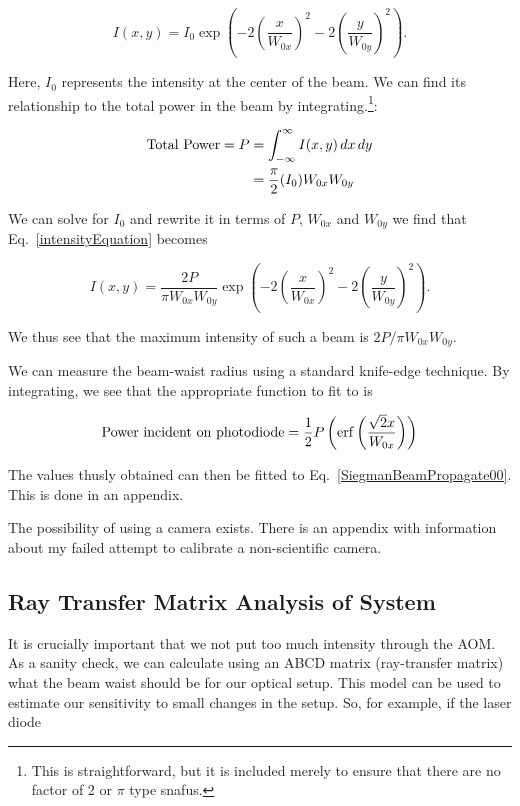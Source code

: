 \begin{equation}
I(x,y)=I_0 \exp \left( -2 \left(\frac{x}{W_{0x}} \right)^2-2 \left( \frac{y}{W_{0y}}\right)^2\right). \label{intensityEquation}
\end{equation}

Here, $I_0$ represents the intensity at the center of the beam. We can find its relationship to the total power in the beam by integrating.\footnote{This is straightforward, but it is included merely to ensure that there are no factor of 2 or $\pi$ type snafus.}: 

\begin{align}
{\rm Total\ Power}=P&=\int_{-\infty}^\infty I(x,y)\, dx\, dy\\
&=\frac{\pi}{2}(I_0) W_{0x} W_{0y}
\end{align}

We can solve for $I_0$ and rewrite it in terms of $P$, $W_{0x}$ and $W_{0y}$ we find that Eq.\ \ref{intensityEquation} becomes 

\begin{equation}
I(x,y)= \frac{2 P}{\pi W_{0x} W_{0y}}\exp \left( -2 \left(\frac{x}{W_{0x}} \right)^2-2 \left( \frac{y}{W_{0y}}\right)^2\right). \label{intensityEquation2}
\end{equation}

We thus see that the maximum intensity of such a beam is $2P/\pi W_{0x}W_{0y}$.

We can measure the beam-waist radius using a standard knife-edge technique. By integrating, we see that the appropriate function to fit to is 

\begin{equation}
{\rm Power\ incident\ on\ photodiode}=\frac{1}{2} P \left(\erf \left( \frac{\sqrt{2} x}{W_{0x}}\right)\right)
\end{equation}


The values thusly obtained can then be fitted to Eq.\ \ref{SiegmanBeamPropagate00}. This is done in an appendix. 


The possibility of using a camera exists. There is an appendix with information about my failed attempt to calibrate a non-scientific camera. 


\subsection{Ray Transfer Matrix Analysis of System}
It is crucially important that we not put too much intensity through the AOM. As a sanity check, we can calculate using an ABCD matrix (ray-transfer matrix) what the beam waist should be for our optical setup. This model can be used to estimate our sensitivity to small changes in the setup. So, for example, if the laser diode 


